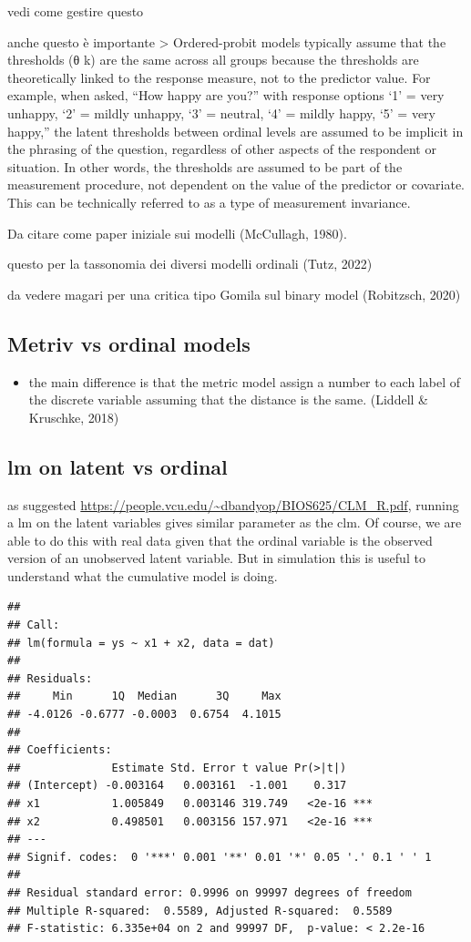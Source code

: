 \documentclass[
  man,floatsintext]{apa6}
\providecommand{\tightlist}{%
  \setlength{\itemsep}{0pt}\setlength{\parskip}{0pt}}
\begin{document}
vedi come gestire questo

anche questo è importante
\textgreater{} Ordered-probit models typically assume that the thresholds (θ k) are the same across all groups because the thresholds are theoretically linked to the response measure, not to the predictor value. For example, when asked, ``How happy are you?'' with response options `1' = very unhappy, `2' = mildly unhappy, `3' = neutral, `4' = mildly happy, `5' = very happy,'' the latent thresholds between ordinal levels are assumed to be implicit in the phrasing of the question, regardless of other aspects of the respondent or situation. In other words, the thresholds are assumed to be part of the measurement procedure, not dependent on the value of the predictor or covariate. This can be technically referred to as a type of measurement invariance.

Da citare come paper iniziale sui modelli (McCullagh, 1980).

questo per la tassonomia dei diversi modelli ordinali (Tutz, 2022)

da vedere magari per una critica tipo Gomila sul binary model (Robitzsch, 2020)

\subsection{Metriv vs ordinal models}\label{metriv-vs-ordinal-models}

\begin{itemize}
\tightlist
\item
  the main difference is that the metric model assign a number to each label of the discrete variable assuming that the distance is the same. (Liddell \& Kruschke, 2018)
\end{itemize}

\subsection{lm on latent vs ordinal}\label{lm-on-latent-vs-ordinal}

as suggested \url{https://people.vcu.edu/~dbandyop/BIOS625/CLM_R.pdf}, running a lm on the latent variables gives similar parameter as the clm. Of course, we are able to do this with real data given that the ordinal variable is the observed version of an unobserved latent variable. But in simulation this is useful to understand what the cumulative model is doing.

\begin{verbatim}
## 
## Call:
## lm(formula = ys ~ x1 + x2, data = dat)
## 
## Residuals:
##     Min      1Q  Median      3Q     Max 
## -4.0126 -0.6777 -0.0003  0.6754  4.1015 
## 
## Coefficients:
##              Estimate Std. Error t value Pr(>|t|)    
## (Intercept) -0.003164   0.003161  -1.001    0.317    
## x1           1.005849   0.003146 319.749   <2e-16 ***
## x2           0.498501   0.003156 157.971   <2e-16 ***
## ---
## Signif. codes:  0 '***' 0.001 '**' 0.01 '*' 0.05 '.' 0.1 ' ' 1
## 
## Residual standard error: 0.9996 on 99997 degrees of freedom
## Multiple R-squared:  0.5589, Adjusted R-squared:  0.5589 
## F-statistic: 6.335e+04 on 2 and 99997 DF,  p-value: < 2.2e-16
\end{verbatim}
\end{document}

